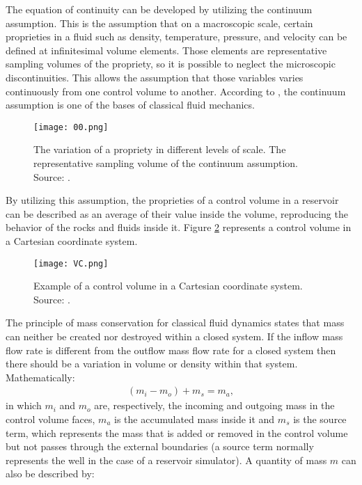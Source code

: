 The equation of continuity can be developed by utilizing the continuum assumption. This is the assumption that on a macroscopic scale, certain proprieties in a fluid such as density, temperature, pressure, and velocity can be defined at infinitesimal volume elements. Those elements are representative sampling volumes of the propriety, so it is possible to neglect the microscopic discontinuities. This allows the assumption that those variables varies continuously from one control volume to another. According to \cite{Fox2008}, the continuum assumption is one of the bases of classical fluid mechanics.
\begin{figure}[H]
	\centering
	\texttt{[image: 00.png]}\\
	\caption{The variation of a propriety in different levels of scale. The representative sampling volume of the continuum assumption. Source: \cite{COLIN201411}.}
	\label{fig:00}
\end{figure}
\noindent
By utilizing this assumption, the proprieties of a control volume in a reservoir can be described as an average of their value inside the volume, reproducing the behavior of the rocks and fluids inside it. Figure \ref{fig:1} represents a control volume in a Cartesian coordinate system.
	\begin{figure}[H]
	\centering
	\texttt{[image: VC.png]}\\
	\caption{Example of a control volume in a Cartesian coordinate system. Source: \cite{Ertekin2001}.}
	\label{fig:1}
	\end{figure}
The principle of mass conservation for classical fluid dynamics states that mass can neither be created nor destroyed within a closed system. If the inflow mass flow rate is different from the outflow mass flow rate for a closed system then there should be a variation in volume or density within that system. Mathematically:
	\begin{align}
	\label{eq:1}
	(m_i-m_o)+m_s=m_a ,
	\end{align}
in which $m_i$ and $m_o$ are, respectively, the incoming and outgoing mass in the control volume faces, $m_a$ is the accumulated mass inside it and $m_s$ is the source term, which represents the mass that is added or removed in the control volume but not passes through the external boundaries (a source term normally represents the well in the case of a reservoir simulator). A quantity of mass $m$ can also be described by:
